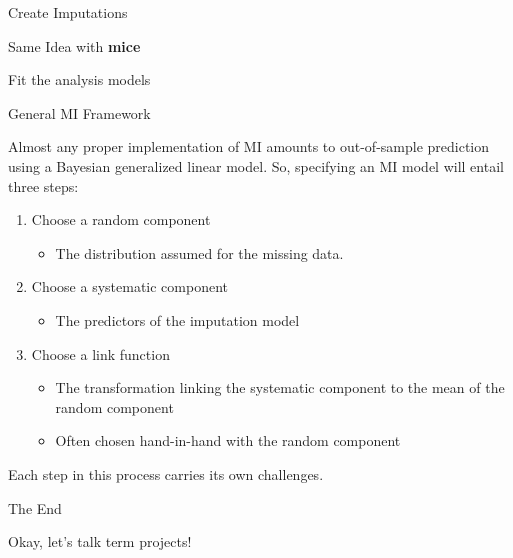 \documentclass{beamer}
\begin{document}
\begin{frame}{Create Imputations}



\end{frame}


\begin{frame}{Same Idea with \textbf{mice}}



\end{frame}


\begin{frame}[allowframebreaks]{Fit the analysis models}



\pagebreak



\end{frame}


\begin{frame}{General MI Framework}

  Almost any proper implementation of MI amounts to out-of-sample
  prediction using a Bayesian generalized linear model. So, specifying
  an MI model will entail three steps:
  \vspace{6pt}
  \begin{enumerate}
  \item Choose a random component
    \begin{itemize}
    \item The distribution assumed for the missing data.
    \end{itemize}
    \vspace{6pt}
  \item Choose a systematic component
    \begin{itemize}
    \item The predictors of the imputation model
    \end{itemize}
    \vspace{6pt}
  \item Choose a link function
    \begin{itemize}
    \item The transformation linking the systematic component to the mean
      of the random component
    \item Often chosen hand-in-hand with the random component
    \end{itemize}
  \end{enumerate}
  \vspace{6pt}
  Each step in this process carries its own challenges.

\end{frame}


\begin{frame}{The End}

  \begin{center}
    \huge{Okay, let's talk term projects!}
  \end{center}

\end{frame}
\end{document}
